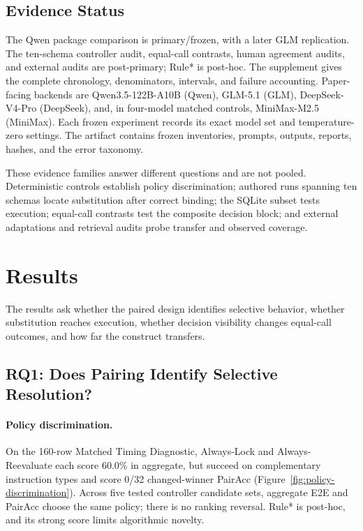 \documentclass[letterpaper]{article}
\newcommand{\PrimaryDiagnostic}{Matched Timing Diagnostic}
\begin{document}
\subsection{Evidence Status}
The Qwen package comparison is primary/frozen, with a later GLM replication. The ten-schema
controller audit, equal-call contrasts, human agreement audits, and external audits are post-primary;
Rule* is post-hoc. The supplement gives the complete chronology, denominators, intervals, and
failure accounting. Paper-facing backends are Qwen3.5-122B-A10B (Qwen), GLM-5.1 (GLM),
DeepSeek-V4-Pro (DeepSeek), and, in four-model matched controls, MiniMax-M2.5 (MiniMax).
Each frozen experiment records its exact model set and temperature-zero settings. The artifact contains frozen
inventories, prompts, outputs, reports, hashes, and the error taxonomy.

These evidence families answer different questions and are not pooled. Deterministic controls
establish policy discrimination; authored runs spanning ten schemas locate substitution after
correct binding; the SQLite subset tests execution; equal-call contrasts test the composite
decision block; and external adaptations and retrieval audits probe transfer and observed coverage.

\section{Results}

The results ask whether the paired design identifies selective behavior, whether substitution
reaches execution, whether decision visibility changes equal-call outcomes, and how far the
construct transfers.

\subsection{RQ1: Does Pairing Identify Selective Resolution?}
\paragraph{Policy discrimination.}
On the 160-row \PrimaryDiagnostic{}, Always-Lock and Always-Reevaluate each score 60.0\% in
aggregate, but succeed on complementary
instruction types and score 0/32 changed-winner PairAcc (Figure~\ref{fig:policy-discrimination}).
Across five tested controller candidate sets, aggregate E2E and PairAcc choose the same policy;
there is no ranking reversal. Rule* is post-hoc, and its strong score limits algorithmic novelty.
\end{document}
